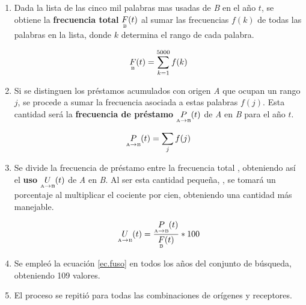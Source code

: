 \begin{enumerate}
	
	\item  Dada la lista de las cinco mil palabras mas usadas de \textit{B} en el año $t$, se obtiene la \textbf{frecuencia total} $\underset{\text{\tiny B}}{F}(t)$ al sumar las frecuencias $f(k)$ de todas las palabras en la lista, donde $k$ determina el rango  de cada palabra.
	
	\begin{equation}
	\label{ec.ftot}
	\underset{\text{\tiny B}}{F}(t) = \sum_{k=1}^{5000} f(k)
	\end{equation}
	
	
	
	\item Si se distinguen los préstamos acumulados con origen \textit{A}  que ocupan un rango $j$,  se procede a sumar la frecuencia asociada a estas palabras $f(j)$. Esta cantidad será la  \textbf{frecuencia de préstamo} $\underset{ \text{\tiny A} \to  \text{\tiny B} }{P}(t)$   de \textit{A} en \textit{B} para el año $t$.
	
	\begin{equation}
	\label{ec.fpres}
	\underset{ \text{\tiny A} \to  \text{\tiny B} }{P}(t) = \sum_{j} f(j)
	\end{equation}
	
	
	\item  Se divide la frecuencia de préstamo entre la frecuencia total , obteniendo así el \textbf{uso} $\underset{ \text{\tiny A} \to  \text{\tiny B} }{U}(t)$  de \textit{A} en \textit{B}.  Al ser esta cantidad pequeña, , se tomará un porcentaje al multiplicar el cociente por cien, obteniendo una cantidad más manejable. 
	
	\begin{equation}
	\label{ec.fuso}
	\underset{ \text{\tiny A} \to  \text{\tiny B} }{U}(t) = \frac{	\underset{ \text{\tiny A} \to  \text{\tiny B} }{P}(t)}{\underset{\text{\tiny B}}{F}(t) } * 100
	\end{equation}
	
	
	
	\item Se empleó la ecuación \ref{ec.fuso} en todos los años del conjunto de búsqueda, obteniendo 109 valores.
	
	\item El proceso se repitió para todas las combinaciones de orígenes y receptores.
	
\end{enumerate}

